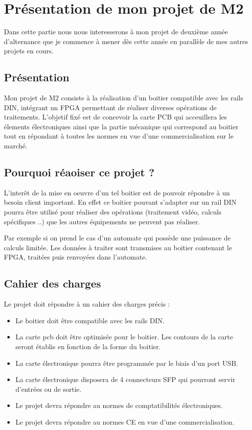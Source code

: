 \section{Présentation de mon projet de M2 }

Dans cette partie nous nous interesserons à mon projet de deuxième année d'alternance que je commence à mener dès cette année en parallèle de mes autres projets en cours. 

\subsection{Présentation}

Mon projet de M2 consiste à la réalisation d'un boitier compatible avec les rails DIN, intégrant un FPGA permettant de réaliser diverses opérations de traitements. L'objetif fixé est de concevoir la carte PCB qui acceuillera les élements électroniques ainsi que la partie mécanique qui correspond au boitier tout en répondant à toutes les normes en vue d'une commercialisation sur le marché. 

\subsection {Pourquoi réaoiser ce projet ? } 

L'interêt de la mise en oeuvre d'un tel boitier est de pouvoir répondre à un besoin client important. En effet ce boitier pouvant s'adapter sur un rail DIN pourra être utilisé pour réaliser des opérations (traitement vidéo, calculs spécifiques ..) que les autres équipements ne peuvent pas réaliser.

Par exemple si on prend le cas d'un automate qui possède une puissance de calculs limitée. Les données à traiter sont transmises au boitier contenant le FPGA, traitées puis renvoyées dans l'automate. 

\subsection {Cahier des charges } 

Le projet doit répondre à un cahier des charges précis : 
\newline
\begin{itemize}
	\item Le boitier doit être compatible avec les rails DIN.
	\item La carte pcb doit être optimisée pour le boitier. Les contours de la carte seront établis en fonction de la forme du boitier.
	\item La carte électronique pourra être programmée par le biais d'un port USB.
	\item La carte électronique disposera de 4 connecteurs SFP qui pourront servir d'entrées ou de sortie.
	\item Le projet devra répondre au normes de comptatibilités électroniques.
	\item Le projet devra répondre au normes CE en vue d'une commercialisation. 

\end{itemize}


